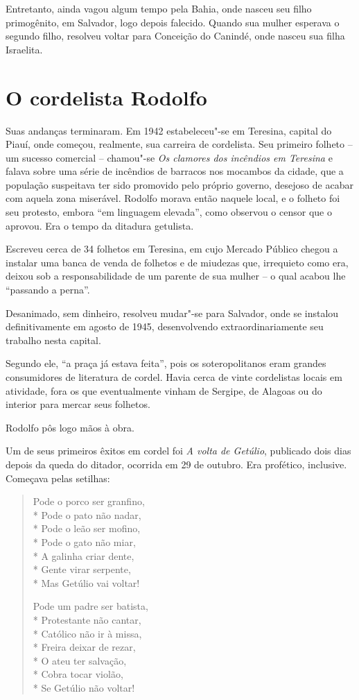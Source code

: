 Entretanto, ainda vagou algum tempo pela Bahia, onde nasceu seu filho
primogênito, em Salvador, logo depois falecido. Quando sua mulher
esperava o segundo filho, resolveu voltar para Conceição do Canindé,
onde nasceu sua filha Israelita.

\section{O cordelista Rodolfo}

Suas andanças terminaram. Em 1942 estabeleceu"-se em Teresina, capital
do Piauí, onde começou, realmente, sua carreira de cordelista. Seu
primeiro folheto -- um sucesso comercial -- chamou"-se
\textit{Os clamores dos incêndios em Teresina} e falava sobre uma série
de incêndios de barracos nos mocambos da cidade, que a população
suspeitava ter sido promovido pelo próprio governo, desejoso de acabar
com aquela zona miserável. Rodolfo morava então naquele local, e o
folheto foi seu protesto, embora ``em linguagem
elevada'', como observou o censor que o aprovou. Era o
tempo da ditadura getulista.

Escreveu cerca de 34 folhetos em Teresina, em cujo Mercado Público
chegou a instalar uma banca de venda de folhetos e de miudezas que,
irrequieto como era, deixou sob a responsabilidade de um parente de sua
mulher -- o qual acabou lhe ``passando a
perna''.

Desanimado, sem dinheiro, resolveu mudar"-se para Salvador, onde se
instalou definitivamente em agosto de 1945, desenvolvendo
extraordinariamente seu trabalho nesta capital.

Segundo ele, ``a praça já estava feita'',
pois os soteropolitanos eram grandes consumidores de literatura de
cordel. Havia cerca de vinte cordelistas locais em atividade, fora os
que eventualmente vinham de Sergipe, de Alagoas ou do interior para
mercar seus folhetos.

Rodolfo pôs logo mãos à obra.

Um de seus primeiros êxitos em cordel foi \textit{A volta de Getúlio},
publicado dois dias depois da queda do ditador, ocorrida em 29 de
outubro. Era profético, inclusive. Começava pelas setilhas:

\begin{verse}
Pode o porco ser granfino,\\*
Pode o pato não nadar,\\*
Pode o leão ser mofino,\\*
Pode o gato não miar,\\*
A galinha criar dente,\\*
Gente virar serpente,\\*
Mas Getúlio vai voltar!

Pode um padre ser batista,\\*
Protestante não cantar,\\*
Católico não ir à missa,\\*
Freira deixar de rezar,\\*
O ateu ter salvação,\\*
Cobra tocar violão,\\*
Se Getúlio não voltar!
\end{verse}

